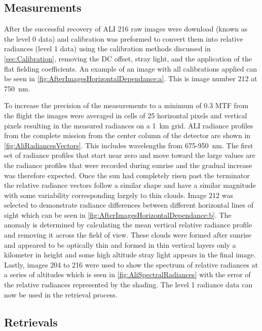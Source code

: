 \documentclass[12pt]{article}
\begin{document}
\subsection{Measurements}

After the successful recovery of ALI 216 raw images were download (known as the level 0 data) and calibration was preformed to convert them into relative radiances (level 1 
data) using the calibration methods discussed in \autoref{sec:Calibration}, removing the DC offset, stray light, and the application of the flat fielding coefficients. An 
example of an image with all calibrations applied can be seen in \autoref{fig:AfterImagesHorizontalDependance:a}. This is image number 212 at 750~nm.

To increase the precision of the measurements to a minimum of 0.3 MTF from the flight the images were averaged in cells of 25 horizontal pixels and vertical pixels resulting in 
the measured radiances on a 1~km grid.  ALI radiance profiles from the complete mission from the center column of the detector are shown in \autoref{fig:AliRadiancesVectors}. 
This includes wavelengths from 675-950~nm. The first set of radiance profiles that start near zero and move toward the large values are the radiance profiles that were recorded 
during sunrise and the gradual increase was therefore expected. Once the sun had completely risen past the terminator the relative radiance vectors follow a similar shape and 
have a similar magnitude with some variability corresponding largely to thin clouds. Image 212 was selected to demonstrate radiance differences between different horizontal 
lines of sight which can be seen in \autoref{fig:AfterImagesHorizontalDependance:b}. The anomaly is determined by calculating the mean vertical relative radiance profile and 
removing it across the field of view. These clouds were formed after sunrise and appeared to be optically thin and formed in thin vertical layers only a kilometer in height and 
some high altitude stray light appears in the final image. Lastly, images 204 to 216 were used to show the spectrum of relative radiances at a series of altitudes which is seen 
in \autoref{fig:AliSpectralRadiances} with the error of the relative radiances represented by the shading. The level 1 radiance data can now be used in the retrieval process.

\subsection{Retrievals}
\label{sec:retrievals}
\end{document}
